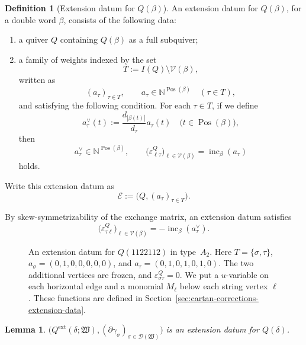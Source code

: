 \documentclass[10pt,a4paper]{article}
\newtheorem{lemma}[theorem]{Lemma}
\theoremstyle{definition}
\newtheorem{definition}[theorem]{Definition}
\theoremstyle{remark}
\newcommand{\Dcal}{\mathcal D}
\newcommand{\Vcal}{\mathcal V}
\newcommand{\eps}{\varepsilon}
\newcommand{\fW}{\mathfrak W}
\begin{document}
\begin{definition}[Extension datum for \(Q(\beta)\)]
\label{def:double-word-quiver-extension-datum}
An extension datum for \(Q(\beta)\), for a double word \(\beta\), consists of
the following data:
\begin{enumerate}
 \item a quiver \(Q\) containing \(Q(\beta)\) as a full subquiver;
 \item a family of weights indexed by the set
 \[
  T:=I(Q)\setminus\Vcal(\beta),
 \]
 written as
\[
  (a_\tau)_{\tau\in T},
  \qquad
  a_\tau\in\mathbb N^{\operatorname{Pos}(\beta)}
  \quad(\tau\in T),
 \]
 and satisfying the following condition.  For each \(\tau\in T\), if we define
\[
  a_\tau^\vee(t):=\frac{d_{|\beta(t)|}}{d_\tau}a_\tau(t)
  \quad\bigl(t\in\operatorname{Pos}(\beta)\bigr),
 \]
 then
\begin{equation}
  a_\tau^\vee\in\mathbb N^{\operatorname{Pos}(\beta)},
  \qquad
  \bigl(\eps^Q_{\ell\tau}\bigr)_{\ell\in\Vcal(\beta)}
  =\operatorname{inc}_\beta(a_\tau)
  \label{eq:extension-datum-mixed-blocks}
 \end{equation}
 holds.
\end{enumerate}
Write this extension datum as
\[
 \mathcal E:=\bigl(Q,(a_\tau)_{\tau\in T}\bigr).
\]
\end{definition}

By skew-symmetrizability of the exchange matrix, an extension datum satisfies
\begin{equation}
 \bigl(\eps^Q_{\tau\ell}\bigr)_{\ell\in\Vcal(\beta)}
 =-\operatorname{inc}_\beta(a_\tau^\vee).
 \label{eq:extension-datum-dual-mixed-block}
\end{equation}

\begin{figure}[htbp]
\centering

\caption{An extension datum for \(Q(1122112)\) in type~\(A_2\).  Here
\(T=\{\sigma,\tau\}\), \(a_\sigma=(0,1,0,0,0,0,0)\), and
\(a_\tau=(0,1,0,1,0,1,0)\).  The two additional vertices are frozen, and
\(\eps^Q_{\sigma\tau}=0\). We put a \(u\)-variable on each horizontal edge and
a monomial \(M_\ell\) below each string vertex \(\ell\).  These functions are
defined in
Section~\ref{sec:cartan-corrections-extension-data}.}
\label{fig:SW-1122112-extension-datum}
\end{figure}

\begin{lemma}
\label{lem:terminal-extension-datum}
\(\bigl(Q^{\mathrm{ext}}(\delta;\fW), (\partial\gamma_\sigma)_{\sigma\in\Dcal(\fW)}\bigr)\) is an extension datum
for \(Q(\delta)\).
\end{lemma}
\end{document}
